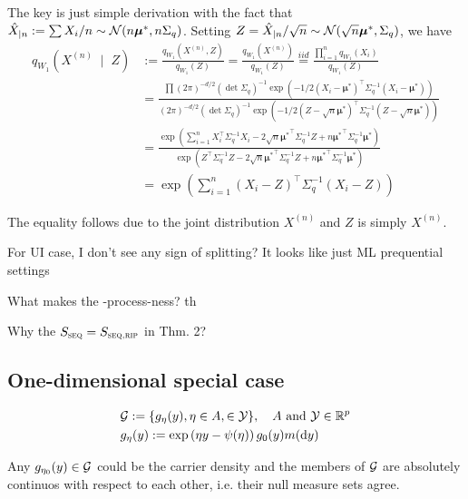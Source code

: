 The key is just simple derivation with the fact that $\hat{X}_{|n}:=\sum X_i/n \sim \mathcal{N}(n\bm{\mu}^*,n\Sigma_q)$.
Setting $Z=\hat{X}_{|n}/\sqrt{n} \sim \mathcal{N}(\sqrt{n}\bm{\mu}^*,\Sigma_q)$, we have
\begin{align*}
	q_{W_1}(X^{(n)} \;\mid\; Z) & := \frac{q_{W_1}(X^{(n)}, Z)}{q_{W_1}(Z)} = \frac{q_{W_1}(X^{(n)})}{q_{W_1}(Z)}
	\stackrel{iid}{=} \frac{\prod^n_{i=1}q_{W_1}(X_i)}{q_{W_1}(Z)}                                                                                     \\
	                            & = \frac{\prod(2\pi)^{-d/2}(\det \Sigma_q)^{-1} \exp(-1/2 (X_i-\bm{\mu}^*)^\top \Sigma_q^{-1} (X_i - \bm{\mu}^*))}
	                                {(2\pi)^{-d/2}(\det \Sigma_q)^{-1} \exp(-1/2(Z -\sqrt{n} \bm{\mu}^*)^\top \Sigma_q^{-1} (Z -\sqrt{n} \bm{\mu}^*))} \\
	                            & = \frac{\exp(\sum_{i=1}^n X_i^\top\Sigma_q^{-1}X_i - 2 \sqrt{n}{\bm{\mu}^*}^\top\Sigma_q^{-1}Z
		                                + n {\bm{\mu}^*}^\top \Sigma_q^{-1}\bm{\mu}^*)}
	                                {\exp(Z^\top\Sigma_q^{-1}Z - 2 \sqrt{n}{\bm{\mu}^*}^\top\Sigma_q^{-1}Z
		                                + n {\bm{\mu}^*}^\top \Sigma_q^{-1}\bm{\mu}^*)}                        \\
	                            & = \exp(\sum_{i=1}^n (X_i - Z)^\top \Sigma_q^{-1} (X_i - Z))
\end{align*}

The equality follows due to the joint distribution $X^{(n)}$ and $Z$ is simply $X^{(n)}$.

For UI case, I don't see any sign of splitting? It looks like just ML prequential settings

What makes the \E-process-ness? th

Why the $S_{\textsc{seq}} = S_{\textsc{seq,rip}}$ in Thm. 2?

\subsection{One-dimensional special case}

\begin{align*}
	 & \Gc := \{g_{\eta}(y), \eta \in A,  \in \Yc \}, \quad A \text{ and } \Yc \in \Rf^p \\
	 & g_{\eta}(y) := \exp\left(\eta y - \psi(\eta)\right) g_0(y) m(\dd{y})
\end{align*}

\begin{remark}
	Any $g_{\eta_0}(y) \in \mathcal{G}$ could be the carrier density and the members of $\mathcal{G}$
	are absolutely continuos with respect to each other,
	i.e. their null measure sets agree.
\end{remark}

